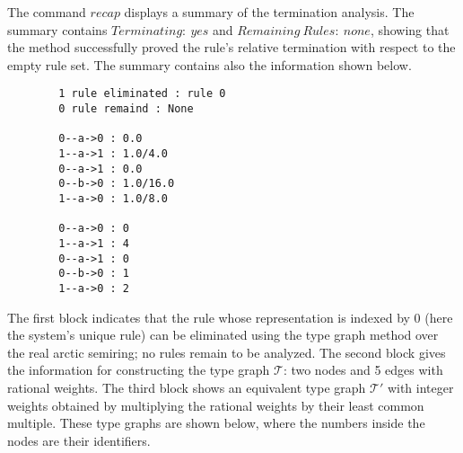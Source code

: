 The command \colorbox{Ivory2}{$recap$} displays a summary of the termination analysis. The summary contains \colorbox{Ivory2}{$Terminating:\ yes$} and \colorbox{Ivory2}{$Remaining\ Rules:\ none$}, showing that the method successfully proved the rule's relative termination with respect to the empty rule set.
The summary contains also the information shown below.
\begin{center}
    \begin{verbatim} 
        1 rule eliminated : rule 0 
        0 rule remaind : None

        0--a->0 : 0.0
        1--a->1 : 1.0/4.0 
        0--a->1 : 0.0
        0--b->0 : 1.0/16.0 
        1--a->0 : 1.0/8.0 

        0--a->0 : 0
        1--a->1 : 4
        0--a->1 : 0
        0--b->0 : 1
        1--a->0 : 2
    \end{verbatim}
\end{center}
The first block indicates that the rule whose representation is indexed by \colorbox{Ivory2}{0} (here the system's unique rule) can be eliminated using the type graph method over the real arctic semiring; no rules remain to be analyzed. The second block gives the information for constructing the type graph $\mathcal{T}$: two nodes and 5 edges with rational weights. The third block shows an equivalent type graph $\mathcal{T}'$ with integer weights obtained by multiplying the rational weights by their least common multiple. These type graphs are shown below, where the numbers inside the nodes are their identifiers.
